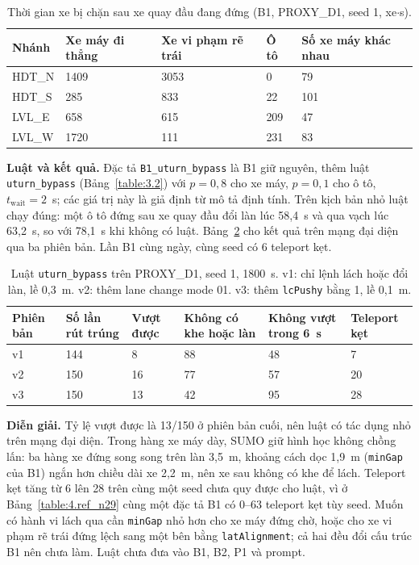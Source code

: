 \documentclass[../DoAn.tex]{subfiles}
\begin{document}
\begin{table}[H]
\centering
\small
\caption{Thời gian xe bị chặn sau xe quay đầu đang đứng (B1, PROXY\_D1, seed 1, xe$\cdot$s).}
\label{table:4.uturn_block}
\begin{tabular}{|p{3.2cm}|p{2.6cm}|p{2.8cm}|p{1.6cm}|p{2.2cm}|}
\hline
\textbf{Nhánh} & \textbf{Xe máy đi thẳng} & \textbf{Xe vi phạm rẽ trái} & \textbf{Ô tô} & \textbf{Số xe máy khác nhau} \\ \hline
HDT\_N & 1409 & 3053 & 0 & 79 \\ \hline
HDT\_S & 285 & 833 & 22 & 101 \\ \hline
LVL\_E & 658 & 615 & 209 & 47 \\ \hline
LVL\_W & 1720 & 111 & 231 & 83 \\ \hline
\end{tabular}
\end{table}

\textbf{Luật và kết quả.} Đặc tả \texttt{B1\_uturn\_bypass} là B1 giữ nguyên, thêm luật \texttt{uturn\_bypass} (Bảng~\ref{table:3.2}) với $p = 0{,}8$ cho xe máy, $p = 0{,}1$ cho ô tô, $t_{\text{wait}} = 2$~s; các giá trị này là giả định từ mô tả định tính. Trên kịch bản nhỏ luật chạy đúng: một ô tô đứng sau xe quay đầu đổi làn lúc 58,4~s và qua vạch lúc 63,2~s, so với 78,1~s khi không có luật. Bảng~\ref{table:4.uturn_rule} cho kết quả trên mạng đại diện qua ba phiên bản. Lần B1 cùng ngày, cùng seed có 6 teleport kẹt.

\begin{table}[H]
\centering
\small
\caption{Luật \texttt{uturn\_bypass} trên PROXY\_D1, seed 1, 1800~s. v1: chỉ lệnh lách hoặc đổi làn, lề 0,3~m. v2: thêm lane change mode 01. v3: thêm \texttt{lcPushy} bằng 1, lề 0,1~m.}
\label{table:4.uturn_rule}
\begin{tabular}{|p{1.4cm}|p{1.9cm}|p{1.9cm}|p{2.6cm}|p{2.6cm}|p{1.9cm}|}
\hline
\textbf{Phiên bản} & \textbf{Số lần rút trúng} & \textbf{Vượt được} & \textbf{Không có khe hoặc làn} & \textbf{Không vượt trong 6~s} & \textbf{Teleport kẹt} \\ \hline
v1 & 144 & 8 & 88 & 48 & 7 \\ \hline
v2 & 150 & 16 & 77 & 57 & 20 \\ \hline
v3 & 150 & 13 & 42 & 95 & 28 \\ \hline
\end{tabular}
\end{table}

\textbf{Diễn giải.} Tỷ lệ vượt được là 13/150 ở phiên bản cuối, nên luật có tác dụng nhỏ trên mạng đại diện. Trong hàng xe máy dày, SUMO giữ hình học không chồng lấn: ba hàng xe đứng song song trên làn 3,5~m, khoảng cách dọc 1,9~m (\texttt{minGap} của B1) ngắn hơn chiều dài xe 2,2~m, nên xe sau không có khe để lách. Teleport kẹt tăng từ 6 lên 28 trên cùng một seed chưa quy được cho luật, vì ở Bảng~\ref{table:4.ref_n29} cùng một đặc tả B1 có 0--63 teleport kẹt tùy seed. Muốn có hành vi lách qua cần \texttt{minGap} nhỏ hơn cho xe máy đứng chờ, hoặc cho xe vi phạm rẽ trái đứng lệch sang một bên bằng \texttt{latAlignment}; cả hai đều đổi cấu trúc B1 nên chưa làm. Luật chưa đưa vào B1, B2, P1 và prompt.
\end{document}
